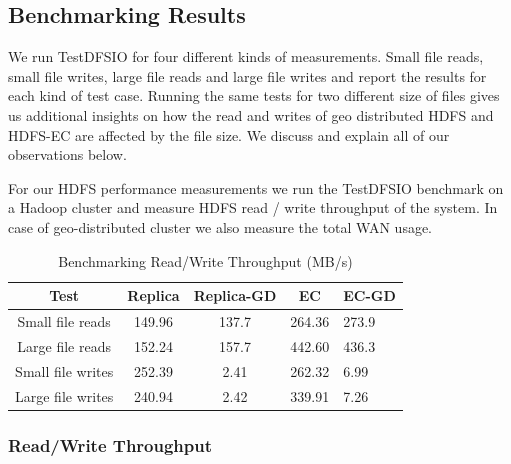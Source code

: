 \documentclass{sig-alternate-05-2015}
\begin{document}
\subsection{Benchmarking Results}
\label{sec:bench-results}
We run TestDFSIO for four different kinds of measurements. Small file reads, small file writes, large file reads and large file writes and report the results for each kind of test case. Running the same tests for two different size of  files gives us additional insights on how the read and writes of geo distributed HDFS and HDFS-EC are affected by the file size. We discuss and explain all of our observations below. 

For our HDFS performance measurements we run the TestDFSIO benchmark on a Hadoop cluster and measure HDFS read / write throughput of the system. In case of geo-distributed cluster we also measure the total WAN usage. 

\begin{table}
\centering
\label{tput:table}
\begin{tabular}{|c|c|c|c|l|} \hline
Test&Replica&Replica-GD&EC&EC-GD\\ \hline
Small file reads&149.96&137.7&264.36&273.9\\ \hline
Large file reads&152.24&157.7&442.60&436.3\\ \hline
Small file writes&252.39&2.41&262.32&6.99\\ \hline
Large file writes&240.94&2.42&339.91&7.26 \\

\hline\end{tabular}
\caption{Benchmarking Read/Write Throughput (MB/s)}
\end{table}

\subsubsection{Read/Write Throughput}
\end{document}
